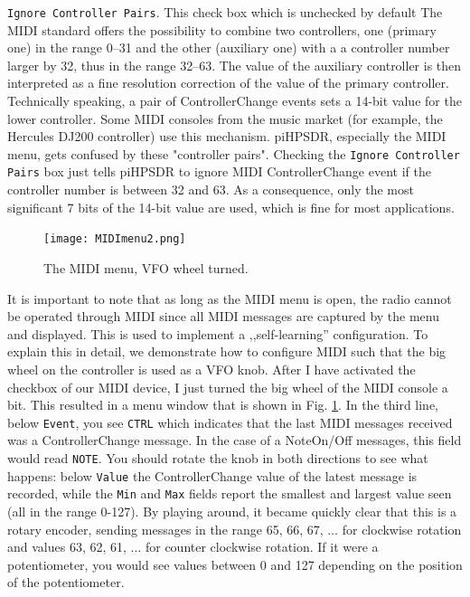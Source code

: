 \documentclass[12pt]{book}
\def\rett#1{\texttt{\color{red}#1}}
\def\pH{pi\-HPSDR\xspace}
\begin{document}
\rett{Ignore Controller Pairs}. This check box  which is unchecked by default
The MIDI standard offers the possibility to combine two controllers, one
(primary one) in the range 0--31 and the other (auxiliary one)
with a a controller number larger by 32, thus in
the range 32--63. The value of the auxiliary controller is then interpreted as a
fine resolution correction of the value of the primary controller. Technically
speaking,
a pair of ControllerChange events sets a 14-bit value for the lower controller.
Some MIDI consoles
from the music market (for example, the Hercules DJ200 controller)
use this mechanism. \pH, especially the MIDI menu, gets confused
by these "controller pairs". Checking the \rett{Ignore Controller Pairs} box just tells
\pH to ignore MIDI ControllerChange event if the controller number is between 32 and 63.
As a consequence, only the most significant 7 bits of the 14-bit value are used, which
is fine for most applications.

\begin{figure}[ht]
\center
\texttt{[image: MIDImenu2.png]}
\caption{The MIDI menu, VFO wheel turned.}
\label{fig:MIDImenu2}
\end{figure}

It is important to note that as long as the MIDI menu is open, the radio cannot be
operated through MIDI since all MIDI messages are captured by the menu and
displayed. This is used to implement a ,,self-learning'' configuration. To explain
this in detail, we demonstrate how to configure MIDI such that the big wheel on the
controller is used as a VFO knob. After I have activated the checkbox of our
MIDI device, I just turned the big wheel of the MIDI console a bit. This resulted
in a menu window that is shown in Fig. \ref{fig:MIDImenu2}. In the third line,
below \rett{Event}, you see \texttt{CTRL} which indicates that the last MIDI messages
received was a ControllerChange message. In the case of a NoteOn/Off messages, this
field would read \texttt{NOTE}. You should rotate the knob in both directions to
see what happens: below \rett{Value} the ControllerChange value of the latest
message is recorded, while the \rett{Min} and \rett{Max} fields report the smallest
and largest value seen (all in the range 0-127). By playing around, it became
quickly clear that this is a rotary encoder, sending messages in the range 65, 66, 67,
$\ldots$ for clockwise rotation and values 63, 62, 61, $\ldots$ for counter clockwise
rotation. If it were a potentiometer, you would see values between 0 and 127
depending on the position of the potentiometer.
\end{document}
